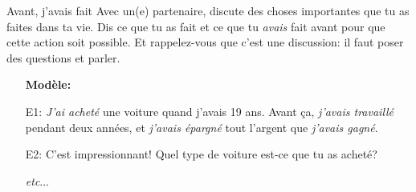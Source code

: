 \begin{frame}{Avant, j'avais fait}
  Avec un(e) partenaire, discute des choses importantes que tu as faites dans ta vie.
  Dis ce que tu as fait \alert{et} ce que tu \emph{avais} fait avant pour que cette action soit possible.
  Et rappelez-vous que c'est une discussion: il faut poser des questions et parler.
  \begin{itemize}
    \item[] \textbf{Modèle:}
    \item[E1:] \emph{J'ai acheté} une voiture quand j'avais 19 ans. Avant ça, \emph{j'avais travaillé} pendant deux années, et \emph{j'avais épargné} tout l'argent que \emph{j'avais gagné}.
    \item[E2:] C'est impressionnant! Quel type de voiture est-ce que tu as acheté?
    \item[] \emph{etc}...
  \end{itemize}
\end{frame}
